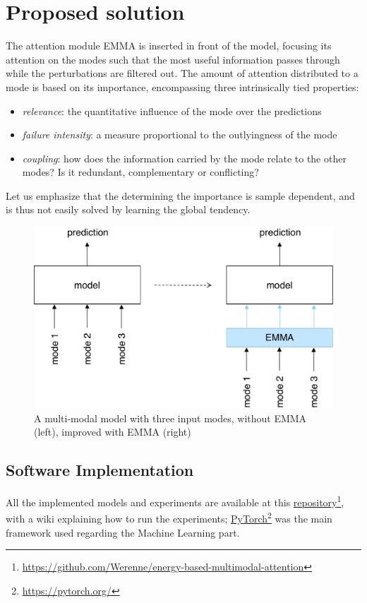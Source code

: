 \section{Proposed solution}\label{sec:proposed-solution}
The attention module EMMA is inserted in front of the model, focusing its attention on the modes such that the most useful information passes through while the perturbations are filtered out. The amount of attention distributed to a mode is based on its importance, encompassing three intrinsically tied properties:
\begin{itemize}
\item \textit{relevance}: the quantitative influence of the mode over the predictions
\item \textit{failure intensity}: a measure proportional to the outlyingness of the mode
\item \textit{coupling}: how does the information carried by the mode relate to the other modes? Is it redundant, complementary or conflicting?
\end{itemize}
Let us emphasize that the determining the importance is sample dependent, and is thus not easily solved by learning the global tendency.
\begin{figure}[!h]
\centering
\includegraphics[scale=0.45]{figures/introduction-three-modes-with-emma}
\caption[Multi-Modal model with/without EMMA]{A multi-modal model with three input modes, without EMMA (left), improved with EMMA (right)}	
\label{fig:main-idea}
\end{figure}

\subsection*{Software Implementation}
All the implemented models and experiments are available at this \href{https://github.com/Werenne/energy-based-multimodal-attention}{repository}\footnote{\url{https://github.com/Werenne/energy-based-multimodal-attention}}, with a wiki explaining how to run the experiments; \href{https://pytorch.org/}{PyTorch}\footnote{\url{https://pytorch.org/}} was the main framework used regarding the Machine Learning part.


